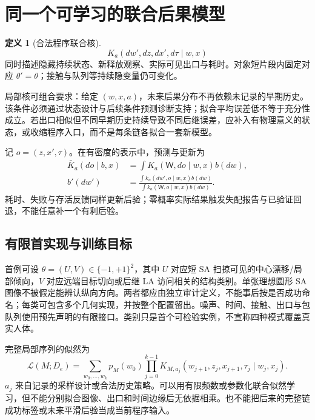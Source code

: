 \documentclass[11pt,a4paper,fontset=fandol]{ctexart}
\theoremstyle{definition}\newtheorem{definition}[theorem]{定义}
\theoremstyle{remark}\newtheorem{remark}[theorem]{说明}
\numberwithin{equation}{section}
\begin{document}
\section{同一个可学习的联合后果模型}
\label{sec:model}
\begin{definition}[合法程序联合核]
\begin{equation}
 K_a(dw',dz,dx',d\tau\mid w,x)
 \label{eq:kernel}
\end{equation}
同时描述隐藏持续状态、新释放观察、实际可见出口与耗时。对象短片段内固定对应 $\theta'=\theta$；接触与队列等持续隐变量仍可变化。
\end{definition}

局部核可组合要求：给定 $(w,x,a)$，未来后果分布不再依赖未记录的早期历史。该条件必须通过状态设计与后续条件预测诊断支持；拟合平均误差低不等于充分性成立。若出口相似但不同早期历史持续导致不同后继误差，应补入有物理意义的状态，或收缩程序入口，而不是每条链各拟合一套新模型。

记 $o=(z,x',\tau)$。在有密度的表示中，预测与更新为
\begin{align}
 \bar K_a(do\mid b,x)&=\int K_a(\mathsf W,do\mid w,x)b(dw),\\
 b'(dw')&=\frac{\int k_a(dw',o\mid w,x)b(dw)}
 {\int k_a(\mathsf W,o\mid w,x)b(dw)}.
 \label{eq:update}
\end{align}
耗时、失败与存活反馈同样更新后验；零概率实际结果触发失配报告与已验证回退，不能任意补一个有利后验。

\subsection{有限首实现与训练目标}
首例可设 $\theta=(U,V)\in\{-1,+1\}^2$，其中 $U$ 对应短 SA 扫掠可见的中心漂移/局部倾向，$V$ 对应远端目标切向或后继 LA 访问相关的结构类别。单张理想圆形 SA 图像不被假定能辨认纵向方向。两者都应由独立审计定义，不能事后按是否成功命名；每类可包含多个几何实现，并按整个配置留出。噪声、时间、接触、出口与包队列使用预先声明的有限接口。类别只是首个可检验实例，不宣称四种模式覆盖真实人体。

完整局部序列的似然为
\begin{equation}
 \mathcal L(M;D_e)=\sum_{w_0,\ldots,w_k}p_M(w_0)
 \prod_{j=0}^{k-1}K_{M,a_j}(w_{j+1},z_j,x_{j+1},\tau_j\mid w_j,x_j).
 \label{eq:likelihood}
\end{equation}
$a_j$ 来自记录的采样设计或合法历史策略。可以用有限频数或参数化联合似然学习，但不能分别拟合图像、出口和时间边缘后无依据相乘。也不能把后来的完整链成功标签或未来平滑后验当成当前程序输入。
\end{document}
